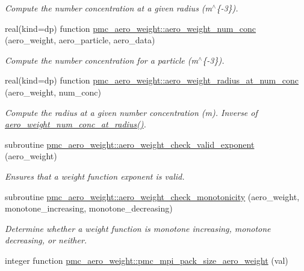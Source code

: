 \begin{DoxyCompactItemize}
\begin{DoxyCompactList}\small\item\em Compute the number concentration at a given radius (m$^\wedge$\{-\/3\}). \end{DoxyCompactList}\item 
real(kind=dp) function \mbox{\hyperlink{namespacepmc__aero__weight_a4c9196faee3f84f1c2b376a654c80672}{pmc\+\_\+aero\+\_\+weight\+::aero\+\_\+weight\+\_\+num\+\_\+conc}} (aero\+\_\+weight, aero\+\_\+particle, aero\+\_\+data)
\begin{DoxyCompactList}\small\item\em Compute the number concentration for a particle (m$^\wedge$\{-\/3\}). \end{DoxyCompactList}\item 
real(kind=dp) function \mbox{\hyperlink{namespacepmc__aero__weight_a2841f7615cd8713081672e3987c9f4eb}{pmc\+\_\+aero\+\_\+weight\+::aero\+\_\+weight\+\_\+radius\+\_\+at\+\_\+num\+\_\+conc}} (aero\+\_\+weight, num\+\_\+conc)
\begin{DoxyCompactList}\small\item\em Compute the radius at a given number concentration (m). Inverse of \mbox{\hyperlink{namespacepmc__aero__weight_aca13cabb919a67bd13c75333b7a8daa9}{aero\+\_\+weight\+\_\+num\+\_\+conc\+\_\+at\+\_\+radius()}}. \end{DoxyCompactList}\item 
subroutine \mbox{\hyperlink{namespacepmc__aero__weight_a02ac941390da0ba2aeff1eeaf75eb5ca}{pmc\+\_\+aero\+\_\+weight\+::aero\+\_\+weight\+\_\+check\+\_\+valid\+\_\+exponent}} (aero\+\_\+weight)
\begin{DoxyCompactList}\small\item\em Ensures that a weight function exponent is valid. \end{DoxyCompactList}\item 
subroutine \mbox{\hyperlink{namespacepmc__aero__weight_aec626ee7f60bda31b58bf46422376800}{pmc\+\_\+aero\+\_\+weight\+::aero\+\_\+weight\+\_\+check\+\_\+monotonicity}} (aero\+\_\+weight, monotone\+\_\+increasing, monotone\+\_\+decreasing)
\begin{DoxyCompactList}\small\item\em Determine whether a weight function is monotone increasing, monotone decreasing, or neither. \end{DoxyCompactList}\item 
integer function \mbox{\hyperlink{namespacepmc__aero__weight_af2fd9b3fdbd2c2a8ac472047c72d668e}{pmc\+\_\+aero\+\_\+weight\+::pmc\+\_\+mpi\+\_\+pack\+\_\+size\+\_\+aero\+\_\+weight}} (val)

\end{DoxyCompactItemize}
